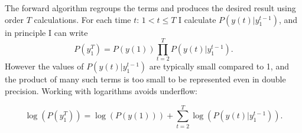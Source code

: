 \documentclass[]{article}
\newcommand{\ts}[3]{#1_{#2}^{#3}}                    %
\newcommand{\ti}[2]{{#1}{(#2)}}                  %
\begin{document}
The forward algorithm regroups the terms and produces the desired
result using order $T$ calculations.  For each time $t:\, 1 < t \leq
T$ I calculate $P(\ti{y}{t}|\ts{y}{1}{t-1})$, and in principle I can
write
\begin{equation*}
  P(\ts{y}{1}{T}) = P(\ti{y}{1}) \prod_{t=2}^T P(\ti{y}{t}|\ts{y}{1}{t-1}).
\end{equation*}
However the values of $P(\ti{y}{t}|\ts{y}{1}{t-1})$ are typically
small compared to 1, and the product of many such terms is too small
to be represented even in double precision.  Working with logarithms
avoids underflow:

\begin{equation}
  \label{eq:logP}
  \log\left( P(\ts{y}{1}{T}) \right) = \log\left( P(\ti{y}{1})
 \right) + \sum_{t=2}^T \log\left( P(\ti{y}{t}|\ts{y}{1}{t-1})\right).
\end{equation}

%
%
\newcommand{\alphax}[2]{%
  \tcboxmath[colback=white,colframe=cyan]{%
    P_{S(#1)|\ts{Y}{1}{#1}}\left(#2 |\ts{y}{1}{#1} \right)%
  }%
}%
\newcommand{\prealpha}{%
  \tcboxmath[colback=white,colframe=MyGreen]{%
    P_{\ti{S}{t}|\ts{Y}{1}{t-1}} \left(s | \ts{y}{1}{t-1} \right)%
  }%
}%
\newcommand{\gammax}{%
  \tcboxmath[colback=white,colframe=MyBlue]{%
    P(\ti{y}{t}|\ts{y}{1}{t-1})%
  }%
}%
\newcommand{\pregamma}{%
  \tcboxmath[colback=white,colframe=red]{%
    P_{\ti{S}{t},\ti{Y}{t}|\ts{Y}{1}{t-1}} \left(s,\ti{y}{t}|\ts{y}{1}{t-1}\right)%
  }%
}%
\end{document}
